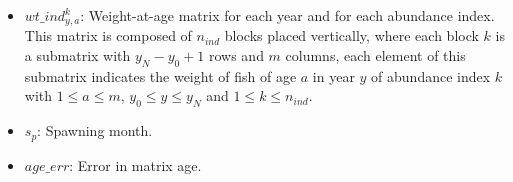 \documentclass{article}
\begin{document}
\begin{itemize}
    \item $wt\_ind^k_{y,a}$: Weight-at-age matrix for each year and for each abundance index. This matrix is composed of $n_{ind}$ blocks placed vertically, where each block $k$ is a submatrix with $y_N-y_0+1$ rows and $m$ columns, each element of this submatrix indicates the weight of fish of age $a$ in year $y$ of abundance index $k$ with $1\leq a \leq m$, $y_0\leq y \leq y_N$ and $1\leq k \leq n_{ind}$.
    \item $s_p$: Spawning month.
    \item $age\_err$: Error in matrix age.

 

\end{itemize}
\end{document}
